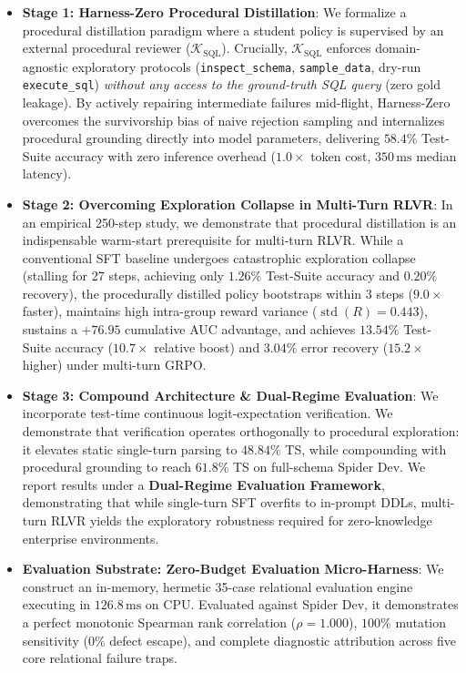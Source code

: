 \documentclass{article}
\theoremstyle{plain}
\theoremstyle{definition}
\theoremstyle{remark}
\begin{document}
\begin{itemize}[leftmargin=*,itemsep=2pt,topsep=2pt]
    \item \textbf{Stage 1: Harness-Zero Procedural Distillation}: We formalize a procedural distillation paradigm where a student policy is supervised by an external procedural reviewer ($\mathcal{K}_{\text{SQL}}$). Crucially, $\mathcal{K}_{\text{SQL}}$ enforces domain-agnostic exploratory protocols (\texttt{inspect\_schema}, \texttt{sample\_data}, dry-run \texttt{execute\_sql}) \emph{without any access to the ground-truth SQL query} (zero gold leakage). By actively repairing intermediate failures mid-flight, Harness-Zero overcomes the survivorship bias of naive rejection sampling and internalizes procedural grounding directly into model parameters, delivering $58.4\%$ Test-Suite accuracy with zero inference overhead ($1.0\times$ token cost, $350\,\text{ms}$ median latency).
    \item \textbf{Stage 2: Overcoming Exploration Collapse in Multi-Turn RLVR}: In an empirical 250-step study, we demonstrate that procedural distillation is an indispensable warm-start prerequisite for multi-turn RLVR. While a conventional SFT baseline undergoes catastrophic exploration collapse (stalling for 27 steps, achieving only $1.26\%$ Test-Suite accuracy and $0.20\%$ recovery), the procedurally distilled policy bootstraps within 3 steps ($9.0\times$ faster), maintains high intra-group reward variance ($\operatorname{std}(R) = 0.443$), sustains a $+76.95$ cumulative AUC advantage, and achieves $13.54\%$ Test-Suite accuracy ($10.7\times$ relative boost) and $3.04\%$ error recovery ($15.2\times$ higher) under multi-turn GRPO.
    \item \textbf{Stage 3: Compound Architecture \& Dual-Regime Evaluation}: We incorporate test-time continuous logit-expectation verification. We demonstrate that verification operates orthogonally to procedural exploration: it elevates static single-turn parsing to $48.84\%$ TS, while compounding with procedural grounding to reach $61.8\%$ TS on full-schema Spider Dev. We report results under a \textbf{Dual-Regime Evaluation Framework}, demonstrating that while single-turn SFT overfits to in-prompt DDLs, multi-turn RLVR yields the exploratory robustness required for zero-knowledge enterprise environments.
    \item \textbf{Evaluation Substrate: Zero-Budget Evaluation Micro-Harness}: We construct an in-memory, hermetic 35-case relational evaluation engine executing in $126.8\,\text{ms}$ on CPU. Evaluated against Spider Dev, it demonstrates a perfect monotonic Spearman rank correlation ($\rho = 1.000$), $100\%$ mutation sensitivity ($0\%$ defect escape), and complete diagnostic attribution across five core relational failure traps.
\end{itemize}
\end{document}

